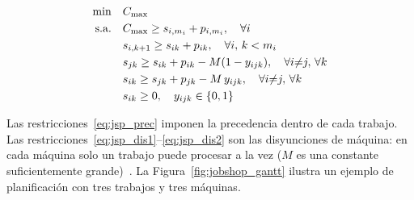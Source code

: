 \begin{align}
  \min \quad & C_{\max} \label{eq:jsp_obj}\\
  \text{s.a.}\quad
             & C_{\max} \geq s_{i,m_i} + p_{i,m_i},
               \quad \forall i \label{eq:jsp_cmax}\\
             & s_{i,k+1} \geq s_{ik} + p_{ik},
               \quad \forall i,\,k < m_i \label{eq:jsp_prec}\\
             & s_{jk} \geq s_{ik} + p_{ik} - M(1-y_{ijk}),
               \quad \forall i{\neq}j,\,\forall k \label{eq:jsp_dis1}\\
             & s_{ik} \geq s_{jk} + p_{jk} - M\,y_{ijk},
               \quad \forall i{\neq}j,\,\forall k \label{eq:jsp_dis2}\\
             & s_{ik} \geq 0,\quad y_{ijk} \in \{0,1\} \notag
\end{align}

Las restricciones~\eqref{eq:jsp_prec} imponen la precedencia dentro de
cada trabajo.
Las restricciones~\eqref{eq:jsp_dis1}--\eqref{eq:jsp_dis2} son las
disyunciones de máquina: en cada máquina solo un trabajo puede procesar
a la vez ($M$ es una constante suficientemente
grande)~\cite{manne1960job,garey1976complexity}.
La Figura~\ref{fig:jobshop_gantt} ilustra un ejemplo de planificación
con tres trabajos y tres máquinas.


